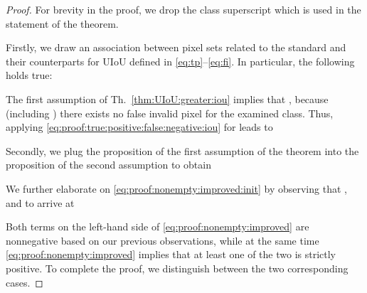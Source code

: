 \documentclass[10pt,twocolumn,letterpaper]{article}
\begin{document}
\begin{proof}
For brevity in the proof, we drop the class superscript  which is used in the statement of the theorem.

Firstly, we draw an association between pixel sets related to the standard  and their counterparts for UIoU defined in \eqref{eq:tp}--\eqref{eq:fi}. In particular, the following holds true:

The first assumption of Th.~\ref{thm:UIoU:greater:iou} implies that , because  (including ) there exists no false invalid pixel for the examined class. Thus, applying \eqref{eq:proof:true:positive:false:negative:iou} for  leads to


Secondly, we plug the proposition of the first assumption of the theorem into the proposition of the second assumption to obtain

We further elaborate on \eqref{eq:proof:nonempty:improved:init} by observing that ,  and  to arrive at


Both terms on the left-hand side of \eqref{eq:proof:nonempty:improved} are nonnegative based on our previous observations, while at the same time \eqref{eq:proof:nonempty:improved} implies that at least one of the two is strictly positive. To complete the proof, we distinguish between the two corresponding cases.


\end{proof}
\end{document}
